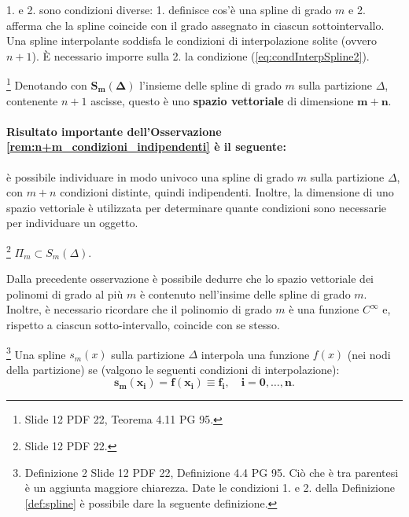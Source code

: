 1. e 2. sono condizioni diverse: 1. definisce cos'è una spline di grado $m$ e 2. afferma che la spline coincide con il grado assegnato in ciascun sottointervallo. Una spline interpolante soddisfa le condizioni di interpolazione solite (ovvero $n+1$). È necessario imporre sulla 2. la condizione (\ref{eq:condInterpSpline2}).

\begin{remark}\label{rem:n+m_condizioni_indipendenti}
    \footnote{Slide 12 PDF 22, Teorema 4.11 PG 95.} Denotando con $\boldsymbol{S_m(\Delta)}$ l'insieme delle spline di grado $m$ sulla partizione $\Delta$, contenente $n+1$ ascisse, questo è uno \textbf{spazio vettoriale} di dimensione $\boldsymbol{m+n}$.
\end{remark}

\paragraph{Risultato importante dell'Osservazione \ref{rem:n+m_condizioni_indipendenti} è il seguente:} è possibile individuare in modo univoco una spline di grado $m$ sulla partizione $\Delta$, con $m+n$ condizioni distinte, quindi indipendenti. Inoltre, la dimensione di uno spazio vettoriale è utilizzata per determinare quante condizioni sono necessarie per individuare un oggetto.

\begin{remark}
    \footnote{Slide 12 PDF 22.} $\Pi_m\subset S_m(\Delta).$
\end{remark}

Dalla precedente osservazione è possibile dedurre che lo spazio vettoriale dei polinomi di grado al più $m$ è contenuto nell'insime delle spline di grado $m$. Inoltre, è necessario ricordare che il polinomio di grado $m$ è una funzione $C^\infty$ e, rispetto a ciascun sotto-intervallo, coincide con se stesso.

\begin{definition}\label{def:condizioni_aggiuntive_spline}\footnote{Definizione 2 Slide 12 PDF 22, Definizione 4.4 PG 95. Ciò che è tra parentesi è un aggiunta maggiore chiarezza. Date le condizioni 1. e 2. della Definizione \ref{def:spline} è possibile dare la seguente definizione.}
    Una spline $s_m(x)$ sulla partizione $\Delta$ interpola una funzione $f(x)$ (nei nodi della partizione) se (valgono le seguenti condizioni di interpolazione): 
    \begin{equation}\label{eq:condInterpSpline}
        \boldsymbol{s_m(x_i)=f(x_i)\equiv f_i,\quad i=0,\hdots,n.}
    \end{equation}
\end{definition}

